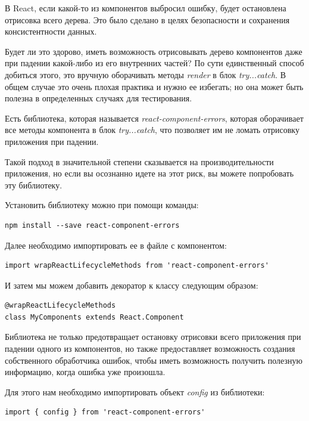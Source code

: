 В React, если какой-то из компонентов выбросил ошибку, будет остановлена отрисовка всего дерева. Это было сделано в целях безопасности и сохранения консистентности данных. 

Будет ли это здорово, иметь возможность отрисовывать дерево компонентов даже при падении какой-либо из его внутренних частей? По сути единственный способ добиться этого, это вручную оборачивать методы \textit{render} в блок \textit{try...catch}. В общем случае это очень плохая практика и нужно ее избегать; но она может быть полезна в определенных случаях для тестирования.

Есть библиотека, которая называется \textit{react-component-errors}, которая оборачивает все методы компонента в блок \textit{try...catch}, что позволяет им не ломать отрисовку приложения при падении.

Такой подход в значительной степени сказывается на производительности приложения, но если вы осознанно идете на этот риск, вы можете попробовать эту библиотеку.

Установить библиотеку можно при помощи команды:

\begin{lstlisting}
npm install --save react-component-errors
\end{lstlisting}

Далее необходимо импортировать ее в файле с компонентом:

\begin{lstlisting}
import wrapReactLifecycleMethods from 'react-component-errors'
\end{lstlisting}

И затем мы можем добавить декоратор к классу следующим образом:

\begin{lstlisting}
@wrapReactLifecycleMethods
class MyComponents extends React.Component
\end{lstlisting}

Библиотека не только предотвращает остановку отрисовки всего приложения при падении одного из компонентов, но также предоставляет возможность создания собственного обработчика ошибок, чтобы иметь возможность получить полезную информацию, когда ошибка уже произошла.

Для этого нам необходимо импортировать объект \textit{config} из библиотеки:

\begin{lstlisting}
import { config } from 'react-component-errors'
\end{lstlisting}

